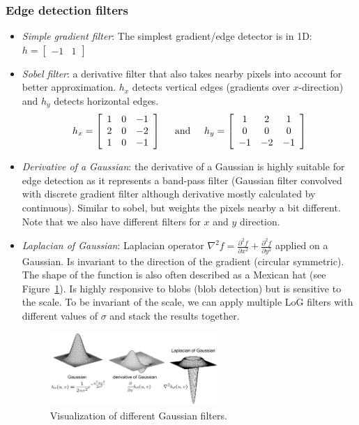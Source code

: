 \subsubsection{Edge detection filters}
\begin{itemize}
	\item \textit{Simple gradient filter}: The simplest gradient/edge detector is in 1D: $h = \left[\begin{array}{cc}-1 & 1\end{array}\right]$ 
	\item \textit{Sobel filter}: a derivative filter that also takes nearby pixels into account for better approximation. $h_x$ detects vertical edges (gradients over $x$-direction) and $h_y$ detects horizontal edges.
	$$h_x = \left[\begin{array}{ccc}
	1 & 0 & -1\\
	2 & 0 & -2\\
	1 & 0 & -1\\
	\end{array}\right] \text{\hspace{5mm}and\hspace{5mm}}h_y = \left[\begin{array}{ccc}
	1 & 2 & 1\\
	0 & 0 & 0\\
	-1 & -2 & -1\\\end{array}\right] $$ 
	\item \textit{Derivative of a Gaussian}: the derivative of a Gaussian is highly suitable for edge detection as it represents a band-pass filter (Gaussian filter convolved with discrete gradient filter although derivative mostly calculated by continuous). Similar to sobel, but weights the pixels nearby a bit different. Note that we also have different filters for $x$ and $y$ direction.
	\item \textit{Laplacian of Gaussian}: Laplacian operator $\nabla^2 f = \frac{\partial^2 
	f}{\partial x^2} + \frac{\partial^2 f}{\partial y^2}$ applied on a Gaussian. Is invariant to the direction of the gradient (circular symmetric). The shape of the function is also often described as a Mexican hat (see Figure~\ref{fig:cv_image_processing_gaussian_filters}). Is highly responsive to blobs (blob detection) but is sensitive to the scale. To be invariant of the scale, we can apply multiple LoG filters with different values of $\sigma$ and stack the results together.
	\begin{figure}[ht!]
		\centering
		\includegraphics[width=0.6\textwidth]{figures/cv_image_processing_gaussian_filters.png}
		\caption{Visualization of different Gaussian filters.}
		\label{fig:cv_image_processing_gaussian_filters}
	\end{figure}
\end{itemize}
